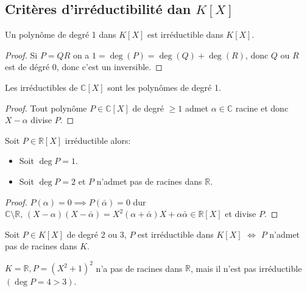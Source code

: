 \subsection{Critères d'irréductibilité dan $K[X]$}

\begin{prop}
	Un polynôme de degré 1 dans $K[X]$ est irréductible dans $K[X]$.
\end{prop}

\begin{proof}
	Si $P = QR$ on a $ 1 = \deg(P) = \deg(Q) + \deg(R)$, donc $Q$ ou $R$ est de dégré 0, donc c'est un inversible.
\end{proof}

\begin{theorem}
	Les irréductibles de $\mathbb{C}[X]$ sont les polynômes de degré 1.
\end{theorem}

\begin{proof}
	Tout polynôme $P\in \mathbb{C}[X]$ de degré $\geq 1$ admet $\alpha \in \mathbb{C}$ racine et donc $X-\alpha$ divise $P$.
\end{proof}

\begin{prop}
	Soit $P \in \mathbb{R}[X]$ irréductible alors:
	\begin{itemize}
		\item Soit $\deg P = 1$.
		\item Soit $\deg P = 2$ et $P$ n'admet pas de racines dans $\mathbb{R}$.
	\end{itemize}
\end{prop}

\begin{proof}
	$P(\alpha) = 0 \implies P(\bar{\alpha}) = 0$
	dur $\mathbb{C} \setminus \mathbb{R}, \, (X- \alpha) (X- \bar{\alpha}) = X ^2(\alpha + \bar{\alpha})X +
		\alpha\bar{\alpha} \in \mathbb{R}[X]$
	et divise $P$.
\end{proof}

\begin{prop}
	Soit $P \in K[X]$ de degré 2 ou 3,
	$P$ est irréductible dans $K[X]$ $\iff$ $P$ n'admet pas de racines dans $K$.
\end{prop}

\begin{example}
	$K = \mathbb{R}, P = (X^2 + 1 )^2$ n'a pas de racines dans $\mathbb{R}$, mais il n'est pas irréductible $(\deg P = 4 > 3)$.
\end{example}

